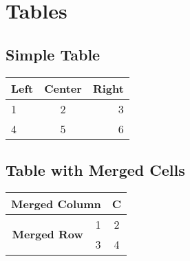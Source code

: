 \begingroup
\raggedright
\section{Tables}


\subsection{Simple Table}
\begin{tabular}{lcr}
    \toprule
    \textbf{Left} & \textbf{Center} & \textbf{Right} \\
    \midrule
    1 & 2 & 3 \\
    4 & 5 & 6 \\
    \bottomrule
\end{tabular}


\subsection{Table with Merged Cells}
\begin{tabular}{|c|c|c|}
    \hline
    \multicolumn{2}{|c|}{\textbf{Merged Column}} & \textbf{C} \\
    \hline
    \multirow{2}{*}{\textbf{Merged Row}} & 1 & 2 \\
    \cline{2-3}
    & 3 & 4 \\
    \hline
\end{tabular}


\endgroup

